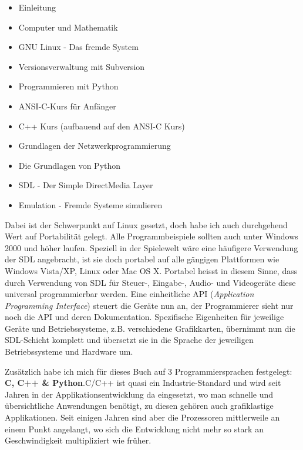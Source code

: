 \documentclass[b5paper,10pt,dvips,fleqn,titlepage,twoside]{book}
\begin{document}
\begin{itemize}
\item Einleitung
\item Computer und Mathematik
\item GNU Linux - Das fremde System
\item Versionsverwaltung mit Subversion
\item Programmieren mit Python
\item ANSI-C-Kurs für Anfänger
\item C++ Kurs (aufbauend auf den ANSI-C Kurs)
\item Grundlagen der Netzwerkprogrammierung
\item Die Grundlagen von Python
\item SDL - Der Simple DirectMedia Layer
\item Emulation - Fremde Systeme simulieren
\end{itemize}\medskip
Dabei ist der Schwerpunkt auf Linux gesetzt, doch habe ich auch durchgehend Wert auf Portabilit\"{a}t gelegt. Alle Programmbeispiele sollten auch unter Windows 2000 und höher laufen.\newline
Speziell in der Spielewelt w\"{a}re eine h\"{a}ufigere Verwendung der SDL angebracht, ist sie doch portabel auf alle g\"{a}ngigen Plattformen wie Windows Vista/XP, Linux oder Mac OS X.\newline
Portabel heisst in diesem Sinne, dass durch Verwendung von SDL f\"{u}r Steuer-, Eingabe-, Audio- und Videoger\"{a}te diese universal programmierbar werden. Eine einheitliche API (\textit{Application Programming Interface}) steuert die Ger\"{a}te nun an, der Programmierer sieht nur noch die API und deren Dokumentation. Spezifische Eigenheiten f\"{u}r jeweilige Ger\"{a}te und Betriebssysteme, z.B. verschiedene Grafikkarten, \"{u}bernimmt nun die SDL-Schicht komplett und \"{u}bersetzt sie in die Sprache der jeweiligen Betriebssysteme und Hardware um.\newline

Zus\"{a}tzlich habe ich mich f\"{u}r dieses Buch auf 3 Programmiersprachen festgelegt: \textbf{C, C++ \& Python}.\newline C/C++ ist quasi ein Industrie-Standard und wird seit Jahren in der Applikationsentwicklung da eingesetzt, wo man schnelle und \"{u}bersichtliche Anwendungen ben\"{o}tigt, zu diesen geh\"{o}ren auch grafiklastige Applikationen. Seit einigen Jahren sind aber die Prozessoren mittlerweile an einem Punkt angelangt, wo sich die Entwicklung nicht mehr so stark an Geschwindigkeit multipliziert wie fr\"{u}her.
\end{document}
